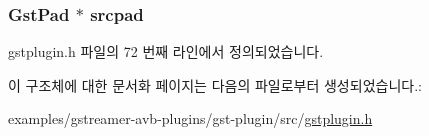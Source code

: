 \subsubsection[{\texorpdfstring{srcpad}{srcpad}}]{\setlength{\rightskip}{0pt plus 5cm}Gst\+Pad $\ast$ srcpad}\hypertarget{struct___gst_plugin_template_a36baa2d004e6d2d99d965e46bc41e1a9}{}\label{struct___gst_plugin_template_a36baa2d004e6d2d99d965e46bc41e1a9}


gstplugin.\+h 파일의 72 번째 라인에서 정의되었습니다.



이 구조체에 대한 문서화 페이지는 다음의 파일로부터 생성되었습니다.\+:\begin{DoxyCompactItemize}
\item 
examples/gstreamer-\/avb-\/plugins/gst-\/plugin/src/\hyperlink{gstplugin_8h}{gstplugin.\+h}\end{DoxyCompactItemize}
